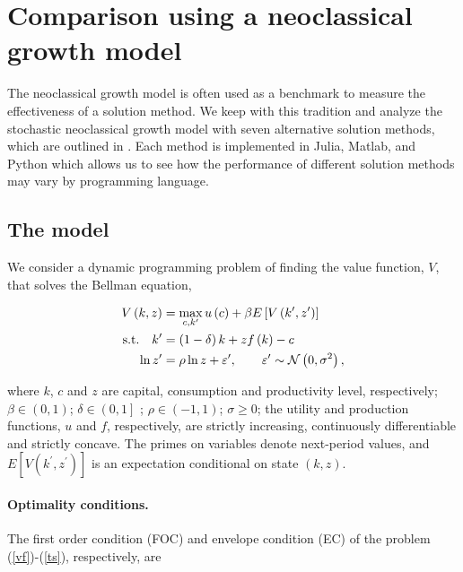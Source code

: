 
\section{Comparison using a neoclassical growth model}

The neoclassical growth model is often used as a benchmark to measure the
effectiveness of a solution method. We keep with this tradition and analyze the
stochastic neoclassical growth model with seven alternative solution methods,
which are outlined in \cite{AMMT2016}. Each method is implemented in Julia,
Matlab, and Python which allows us to see how the performance of different
solution methods may vary by programming language.

\subsection{The model}

We consider a dynamic programming problem of finding the value function,
$V$, that solves the Bellman equation,

\begin{align}
  V \left(k, z\right) &= \max_{c, k^{\prime }} u\left(c\right) +\beta E\left[ V\left( k^{\prime },z^{\prime }\right) \right] \label{vf} \\
  \text{s.t.\quad}k^{\prime } &= \left( 1-\delta \right) k + z f\left( k\right) - c \label{bc} \\
  \ln z^{\prime} &= \rho \ln z + \varepsilon^{\prime },\qquad \varepsilon^{\prime } \sim \mathcal{N}\left( 0,\sigma ^{2}\right), \label{ts}
\end{align}

where $k$, $c$ and $z$ are capital, consumption and productivity level,
respectively; $\beta \in \left( 0,1\right) $; $\delta \in \left( 0,1\right] $ ;
$\rho \in \left( -1,1\right) $; $\sigma \geq 0$; the utility and production
functions, $u$ and $f$, respectively, are strictly increasing, continuously
differentiable and strictly concave. The primes on variables denote next-period
values, and $E\left[ V\left( k^{\prime },z^{\prime }\right) \right] $ is an
expectation conditional on state $\left( k,z\right) $.

\paragraph{Optimality conditions.}

The first order condition (FOC) and envelope condition (EC) of the problem
(\ref{vf})-(\ref{ts}), respectively, are

